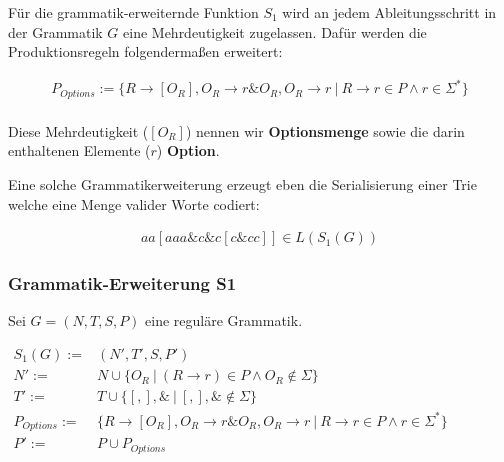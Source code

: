 \documentclass[a4paper,12pt]{report}
\begin{document}
Für die grammatik-erweiternde Funktion $S_1$ wird an jedem Ableitungsschritt in der Grammatik $G$ eine Mehrdeutigkeit zugelassen. Dafür werden die Produktionsregeln folgendermaßen erweitert:

\begin{eqnarray}
  P_{Options} := \{R \rightarrow [O_R], O_R \rightarrow r\& O_R, O_R \rightarrow r \ \vert\ R\rightarrow r\in P \land r\in \Sigma^*\} \\
\end{eqnarray}

Diese Mehrdeutigkeit ($[O_R]$) nennen wir \textbf{Optionsmenge} sowie die darin enthaltenen Elemente ($r$) \textbf{Option}. 

Eine solche Grammatikerweiterung erzeugt eben die Serialisierung einer Trie welche eine Menge valider Worte codiert:

\begin{eqnarray}
  aa[aaa\&c\&c[c\&cc]]\in L(S_1(G))
\end{eqnarray}

\subsubsection{Grammatik-Erweiterung S1}

Sei $G = (N,T,S,P)$ eine reguläre Grammatik.

$
\begin{array}{rl}
  S_1(G) :=& (N', T', S, P') \\
  N' :=& N \cup \{ O_R\ |\ (R\rightarrow r)\in P\land O_R \notin \Sigma\}\\
  T' :=& T \cup \{[ , ], \&\ |\ [,],\&\notin \Sigma \}\\
  P_{Options} :=& \{R \rightarrow [O_R], O_R \rightarrow r\& O_R, O_R \rightarrow r \ \vert\ R\rightarrow r\in P \land r\in \Sigma^*\} \\
  P' :=& P \cup P_{Options} 
\end{array}
$
\end{document}
